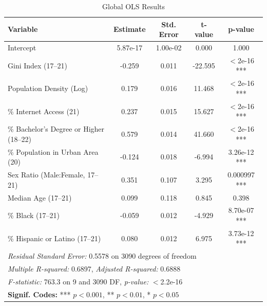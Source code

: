 \documentclass[
]{article}
\begin{document}
\begin{table}[H]
\renewcommand{\arraystretch}{1.5} %
\centering
\caption{Global OLS Results}
\label{tab:ols_results}
\begin{tabular}{lcccc}
\hline
\textbf{Variable} & \textbf{Estimate} & \textbf{Std. Error} & \textbf{t-value} & \textbf{p-value} \\ \hline
Intercept             & 5.87e-17       & 1.00e-02         & 0.000             & 1.000 \\ 
Gini Index (17–21)    & -0.259         & 0.011            & -22.595           & $<$2e-16 *** \\ 
Population Density (Log) & 0.179         & 0.016            & 11.468           & $<$2e-16 *** \\ 
\% Internet Access (21)  & 0.237         & 0.015            & 15.627           & $<$2e-16 *** \\ 
\% Bachelor's Degree or Higher (18–22) & 0.579 & 0.014   & 41.660           & $<$2e-16 *** \\ 
\% Population in Urban Area (20) & -0.124 & 0.018        & -6.994           & 3.26e-12 *** \\ 
Sex Ratio (Male:Female, 17–21) & 0.351   & 0.107          & 3.295            & 0.000997 *** \\ 
Median Age (17–21)     & 0.099         & 0.118            & 0.845            & 0.398 \\ 
\% Black (17–21)       & -0.059        & 0.012            & -4.929           & 8.70e-07 *** \\ 
\% Hispanic or Latino (17–21) & 0.080    & 0.012          & 6.975            & 3.73e-12 *** \\ 
\hline
\multicolumn{5}{l}{\textit{Residual Standard Error:} 0.5578 on 3090 degrees of freedom} \\
\multicolumn{5}{l}{\textit{Multiple R-squared:} 0.6897, \textit{Adjusted R-squared:} 0.6888} \\
\multicolumn{5}{l}{\textit{F-statistic:} 763.3 on 9 and 3090 DF, \textit{p-value:} $<$2.2e-16} \\
\hline
\multicolumn{5}{l}{\textbf{Signif. Codes:} *** $p < 0.001$, ** $p < 0.01$, * $p < 0.05$} \\
\end{tabular}
\end{table}
\end{document}
